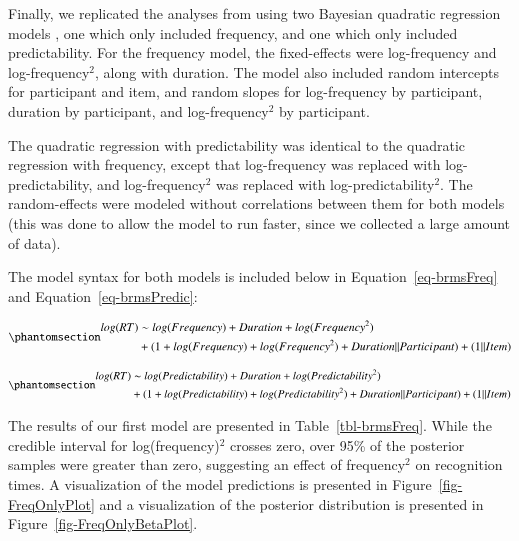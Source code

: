 \documentclass[
  authoryear,
  preprint,
  1p,
  onecolumn]{elsarticle}
\begin{document}
Finally, we replicated the analyses from \citet{kapatsinski2009} using
two Bayesian quadratic regression models \citep[implemented in
\emph{brms;}][]{brms}, one which only included frequency, and one which
only included predictability. For the frequency model, the fixed-effects
were log-frequency and log-frequency\(^2\), along with duration. The
model also included random intercepts for participant and item, and
random slopes for log-frequency by participant, duration by participant,
and log-frequency\(^2\) by participant.

The quadratic regression with predictability was identical to the
quadratic regression with frequency, except that log-frequency was
replaced with log-predictability, and log-frequency\(^2\) was replaced
with log-predictability\(^2\). The random-effects were modeled without
correlations between them for both models (this was done to allow the
model to run faster, since we collected a large amount of data).

The model syntax for both models is included below in
Equation~\ref{eq-brmsFreq} and Equation~\ref{eq-brmsPredic}:

\begin{equation}\phantomsection\label{eq-brmsFreq}{
\begin{aligned}
log(RT) & \sim log(Frequency) + Duration + log(Frequency^2) \\ & + (1 + log(Frequency) + log(Frequency^2) + Duration || Participant) + (1 || Item)
\end{aligned}
}\end{equation}

\begin{equation}\phantomsection\label{eq-brmsPredic}{
\begin{aligned}
log(RT) & \sim log(Predictability) + Duration + log(Predictability^2) \\ & + (1 + log(Predictability) + log(Predictability^2) + Duration || Participant) + (1 || Item)
\end{aligned}
}\end{equation}

The results of our first model are presented in
Table~\ref{tbl-brmsFreq}. While the credible interval for
log(frequency)\(^2\) crosses zero, over 95\% of the posterior samples
were greater than zero, suggesting an effect of frequency\(^2\) on
recognition times. A visualization of the model predictions is presented
in Figure~\ref{fig-FreqOnlyPlot} and a visualization of the posterior
distribution is presented in Figure~\ref{fig-FreqOnlyBetaPlot}.
\end{document}
